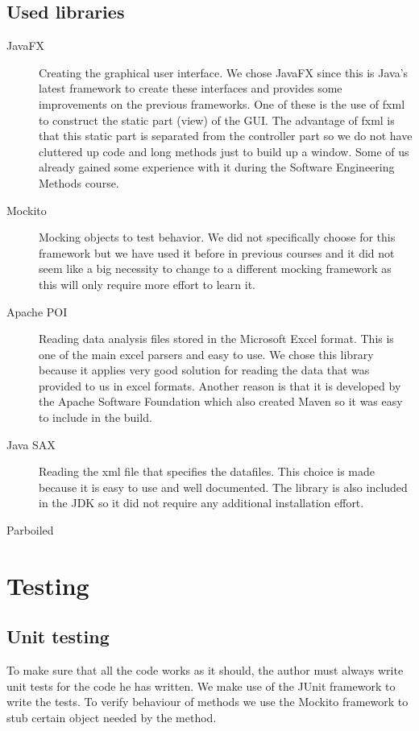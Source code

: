 \documentclass[a4paper]{article}
\begin{document}
\subsection{Used libraries}
\begin{description}

\item[JavaFX] Creating the graphical user interface. We chose JavaFX since this
is Java's latest framework to create these interfaces and provides some
improvements on the previous frameworks. One of these is the use of fxml to
construct the static part (view) of the GUI. The advantage of fxml is that this static part is separated from the controller part so we do not have cluttered up code and long methods just to build up a window. Some of us already gained some
experience with it during the Software Engineering Methods course.

\item[Mockito] Mocking objects to test behavior. We did not specifically choose
for this framework but we have used it before in previous courses and it did not
seem like a big necessity to change to a different mocking framework as this
will only require more effort to learn it.

\item[Apache POI] Reading data analysis files stored in the Microsoft Excel
format. This is one of the main excel parsers and easy to use. We chose this
library because it applies very good solution for reading the data that was
provided to us in excel formats. Another reason is that it is developed by the 
Apache Software Foundation which also created Maven so it was easy to include in
the build.

\item[Java SAX] Reading the xml file that specifies the datafiles. This choice is
made because it is easy to use and well documented. The library is also included
in the JDK so it did not require any additional installation effort.

\item[Parboiled]

\end{description}

\section{Testing}
\subsection{Unit testing}
To make sure that all the code works as it should, the author must always write
unit tests for the code he has written. We make use of the JUnit framework to
write the tests. To verify behaviour of methods we use the Mockito framework to
stub certain object needed by the method.
\end{document}
